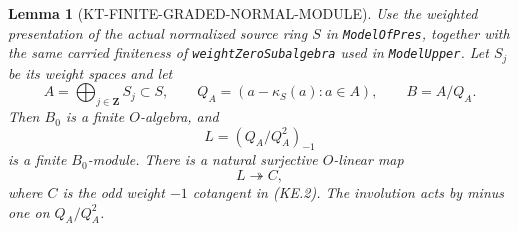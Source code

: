 \documentclass[11pt,a4paper]{article}
\newtheorem{lemma}[theorem]{Lemma}
\theoremstyle{definition}
\begin{document}
\begin{lemma}[KT-FINITE-GRADED-NORMAL-MODULE]
Use the weighted presentation of the actual normalized
source ring $S$ in \texttt{ModelOfPres}, together with the
same carried finiteness of \texttt{weightZeroSubalgebra}
used in \texttt{ModelUpper}.  Let $S_j$ be its
weight spaces and let
\[
 A=\bigoplus_{j\in\mathbf Z}S_j\subset S,
 \qquad Q_A=(a-\kappa_S(a):a\in A),
 \qquad B=A/Q_A.
                                                                  \tag{KF.1}
\]
Then $B_0$ is a finite $O$-algebra, and
\[
                 L=(Q_A/Q_A^2)_{-1}                        \tag{KF.2}
\]
is a finite $B_0$-module.  There is a natural surjective
$O$-linear map
\[
                            L\twoheadrightarrow C,         \tag{KF.3}
\]
where $C$ is the odd weight $-1$ cotangent in (KE.2).
The involution acts by minus one on $Q_A/Q_A^2$.
\end{lemma}
\end{document}
